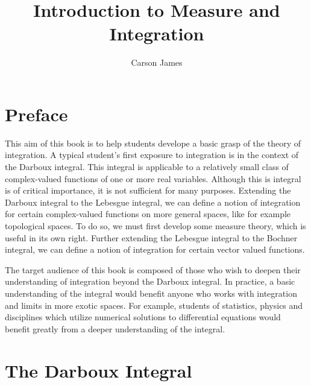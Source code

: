 \documentclass[12pt]{amsart}
\theoremstyle{definition}
\begin{document}
	
	\title{Introduction to Measure and Integration}
	\author{Carson James}
	\maketitle
	
	\tableofcontents
	
	\newpage
	
	\section*{Preface}
	\begin{flushleft}
		This aim of this book is to help students develope a basic grasp of the theory of integration. A typical student's first exposure to integration is in the context of the Darboux integral. This integral is applicable to a relatively small class of complex-valued functions of one or more real variables. Although this is integral is of critical importance, it is not sufficient for many purposes. Extending the Darboux integral to the Lebesgue integral, we can define a notion of integration for certain complex-valued functions on more general spaces, like for example topological spaces. To do so, we must first develop some measure theory, which is useful in its own right. Further extending the Lebesgue integral to the Bochner integral, we can define a notion of integration for certain vector valued functions. 
	\end{flushleft}

	\vspace{.2cm}

	\begin{flushleft}
		The target audience of this book is composed of those who wish to deepen their understanding of integration beyond the Darboux integral. In practice, a basic understanding of the integral would benefit anyone who works with integration and limits in more exotic spaces. For example, students of statistics, physics and disciplines which utilize numerical solutions to differential equations would benefit greatly from a deeper understanding of the integral. 
	\end{flushleft}
	
	
	\newpage
	
	
	
	
	
	
	
	
	\section{The Darboux Integral}
	
\end{document}
